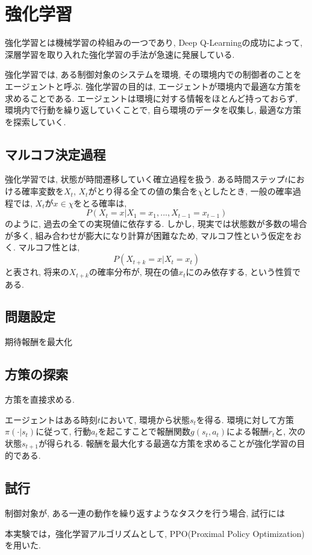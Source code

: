 \documentclass[../main]{subfiles}
\begin{document}
\newpage
\chapter{強化学習}
\label{chap:RL}
強化学習とは機械学習の枠組みの一つであり, 
Deep Q-Learning\cite{ref:dqn}の成功によって, 
深層学習を取り入れた強化学習の手法が急速に発展している.

強化学習では, ある制御対象のシステムを環境, 
その環境内での制御者のことをエージェントと呼ぶ.
強化学習の目的は, エージェントが環境内で最適な方策を求めることである.
エージェントは環境に対する情報をほとんど持っておらず, 
環境内で行動を繰り返していくことで, 
自ら環境のデータを収集し, 最適な方策を探索していく.

\section{マルコフ決定過程}
強化学習では, 状態が時間遷移していく確立過程を扱う.
ある時間ステップ$t$における確率変数を$X_t$, 
$X_t$がとり得る全ての値の集合を$\chi$としたとき, 
一般の確率過程では, $X_t$が$x\in\chi$をとる確率は, 
$$
P(X_t=x|X_1=x_1, ... ,X_{t-1}=x_{t-1})
$$
のように, 過去の全ての実現値に依存する.
しかし, 現実では状態数が多数の場合が多く, 
組み合わせが膨大になり計算が困難なため, 
マルコフ性という仮定をおく.
マルコフ性とは, 
$$P(X_{t+k}=x|X_t=x_t)$$
と表され, 将来の$X_{t+k}$の確率分布が, 
現在の値$x_t$にのみ依存する, という性質である.


\section{問題設定}
期待報酬を最大化

\section{方策の探索}
方策を直接求める.

エージェントはある時刻$t$において, 環境から状態$s_t$を得る.
環境に対して方策$\pi(\cdot|s_t)$に従って, 
行動$a_t$を起こすことで報酬関数$g(s_t,a_t)$による報酬$r_t$と, 
次の状態$s_{t+1}$が得られる. 
報酬を最大化する最適な方策を求めることが強化学習の目的である.

\section{試行}
制御対象が, ある一連の動作を繰り返すようなタスクを行う場合, 
試行には


本実験では，強化学習アルゴリズムとして, 
PPO(Proximal Policy Optimization)
\cite{ref:proximal_policy}を用いた.
\end{document}
